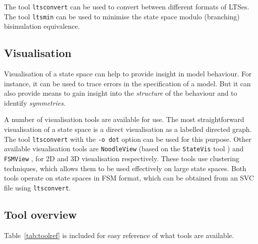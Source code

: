 \documentclass[a4paper,fleqn]{article}
\begin{document}
The tool \texttt{ltsconvert} can be used to convert between different formats
of LTSes.
The tool \texttt{ltsmin} can be used to minimise the state space modulo
(branching) bisimulation equivalence.

\subsection{Visualisation}

Visualisation of a state space can help to provide insight in model behaviour.
For instance, it can be used to trace errors in the specification of a model.
But it can also provide means to gain insight into the \emph{structure} of the
behaviour and to identify \emph{symmetries}.

A number of visualisation tools are available for use.  The most
straightforward visualisation of a state space is a direct visualisation as a
labelled directed graph.  The tool \texttt{ltsconvert} with the \texttt{-o dot}
option can be used for this purpose. Other available visualisation tools are
\texttt{NoodleView} (based on the \texttt{StateVis} tool \cite{Pretorius VanWijk
2005}) and \texttt{FSMView} \cite{VanHam et al 2002}, for 2D and 3D
visualisation respectively.  These tools use clustering techniques, which
allows them to be used effectively on large state spaces.  Both tools operate
on state spaces in FSM format, which can be obtained from an SVC file using
\texttt{ltsconvert}.

\subsection{Tool overview}

Table~\ref{tab:toolref} is included for easy reference of what tools are available.
\end{document}
